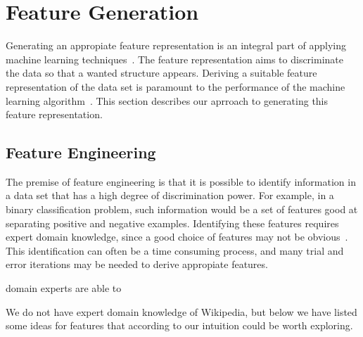 \section{Feature Generation}\label{sec:feature_generation}
Generating an appropiate feature representation is an integral part of applying machine learning techniques~\cite{ng-lecture}. The feature representation aims to discriminate the data so that a wanted structure appears. Deriving a suitable feature representation of the data set is paramount to the performance of the machine learning algorithm~\cite{ng-lecture}.  This section describes our aprroach to generating this feature representation.



\subsection{Feature Engineering}
The premise of feature engineering is that it is possible to identify information in a data set that has a high degree of discrimination power. For example, in a binary classification problem, such information would be a set of features good at separating positive and negative examples. Identifying these features requires expert domain knowledge, since a good choice of features may not be obvious~\cite{ng-lecture}. This identification can often be a time consuming process, and many trial and error iterations may be needed to derive appropiate features.

domain experts are able to

We do not have expert domain knowledge of Wikipedia, but below we have listed some ideas for features that according to our intuition could be worth exploring.

